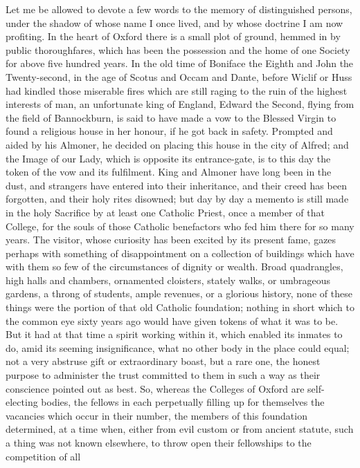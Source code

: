 Let me be allowed to devote a few words to the memory of
distinguished persons, under the shadow of whose name I once lived,
and by whose doctrine I am now profiting. In the heart of Oxford there
is a small plot of ground, hemmed in by public thoroughfares, which
has been the possession and the home of one Society for above five
hundred years. In the old time of Boniface the Eighth and John the
Twenty-second, in the age of Scotus and Occam and Dante, before
Wiclif or Huss had kindled those miserable fires which are still
raging to the ruin of the highest interests of man, an unfortunate
king of England, Edward the Second, flying from the field of
Bannockburn, is said to have made a vow to the Blessed Virgin to found
a religious house in her honour, if he got back in safety. Prompted
and aided by his Almoner, he decided on placing this house in the city
of Alfred; and the Image of our Lady, which is opposite its
entrance-gate, is to this day the token of the vow and its fulfilment.
King and Almoner have long been in the dust, and strangers have
entered into their inheritance, and their creed has been forgotten,
and their holy rites disowned; but day by day a memento is still made
in the holy Sacrifice by at least one Catholic Priest, once a member
of that College, for the souls of those Catholic benefactors who fed
him there for so many years. The visitor, whose curiosity has been
excited by its present fame, gazes perhaps with something of
disappointment on a collection of buildings which have with them so
few of the circumstances of dignity or wealth. Broad quadrangles, high
halls and chambers, ornamented cloisters, stately walks, or umbrageous
gardens, a throng of students, ample revenues, or a glorious history,
none of these things were the portion of that old Catholic foundation;
nothing in short which to the common eye sixty years ago would have
given tokens of what it was to be. But it had at that time a spirit
working within it, which enabled its inmates to do, amid its seeming
insignificance, what no other body in the place could equal; not a
very abstruse gift or extraordinary boast, but a rare one, the honest
purpose to administer the trust committed to them in such a way as
their conscience pointed out as best. So, whereas the Colleges
of Oxford are self-electing bodies, the fellows in each perpetually
filling up for themselves the vacancies which occur in their number,
the members of this foundation determined, at a time when, either from
evil custom or from ancient statute, such a thing was not known
elsewhere, to throw open their fellowships to the competition of all
